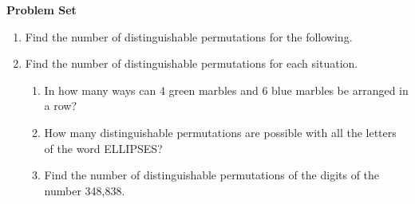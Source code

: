 \textbf{Problem Set}

\vspce

\begin{enumerate}[label = \Alph*. ]
\item \hspce Find the number of distinguishable permutations for the following. 

\begin{enumerate}[label = \arabic*. ]
\end{enumerate}  

\vspce 

\item \hspce Find the number of distinguishable permutations for each situation. 

\begin{enumerate}[label = \arabic*. ]
\item In how many ways can 4 green marbles and 6 blue marbles be arranged in a row?
\item How many distinguishable permutations are possible with all the letters of the word ELLIPSES?
\item Find the number of distinguishable permutations of the digits of the number 348,838.

\end{enumerate}  

\end{enumerate}  

 



